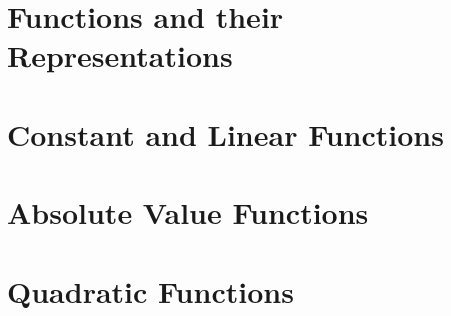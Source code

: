 \documentclass{ximera}
\begin{document}
	\author{Stitz-Zeager}

\section{Functions and their Representations}



\newpage

\section{Constant and Linear Functions}



\newpage


\section{Absolute Value Functions}



\newpage

\section{Quadratic Functions}



\newpage


%



%


%
\end{document}
